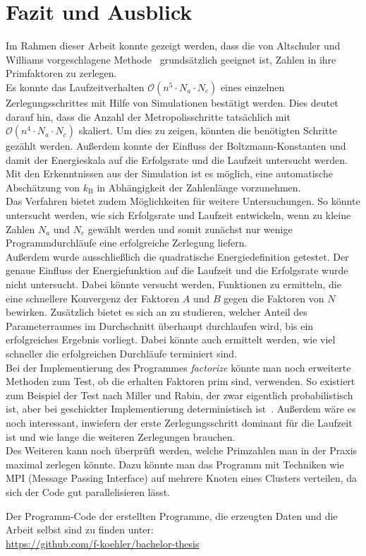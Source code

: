 \chapter{Fazit und Ausblick}\label{ch:conclusion}
Im Rahmen dieser Arbeit konnte gezeigt werden, dass die von Altschuler und Williams vorgeschlagene Methode~\parencite{altschuler} grundsätzlich geeignet ist, Zahlen in ihre Primfaktoren zu zerlegen. \\
Es konnte das Laufzeitverhalten $\mathcal{O}\left(n^5\cdot N_a \cdot N_c\right)$ eines einzelnen Zerlegungsschrittes mit Hilfe von Simulationen bestätigt werden. Dies deutet darauf hin, dass die Anzahl der Metropolisschritte tatsächlich mit $\mathcal{O}\left(n^4\cdot N_a\cdot N_c\right)$ skaliert. Um dies zu zeigen, könnten die benötigten Schritte gezählt werden. Außerdem konnte der Einfluss der Boltzmann-Konstanten und damit der Energieskala auf die Erfolgsrate und die Laufzeit untersucht werden. Mit den Erkenntnissen aus der Simulation ist es möglich, eine automatische Abschätzung von $k_\mathrm{B}$ in Abhängigkeit der Zahlenlänge vorzunehmen. \\
Das Verfahren bietet zudem Möglichkeiten für weitere Untersuchungen. So könnte untersucht werden, wie sich Erfolgsrate und Laufzeit entwickeln, wenn zu kleine Zahlen $N_a$ und $N_c$ gewählt werden und somit zunächst nur wenige Programmdurchläufe eine erfolgreiche Zerlegung liefern. \\
Außerdem wurde ausschließlich die quadratische Energiedefinition getestet. Der genaue Einfluss der Energiefunktion auf die Laufzeit und die Erfolgsrate wurde nicht untersucht. Dabei könnte versucht werden, Funktionen zu ermitteln, die eine schnellere Konvergenz der Faktoren $A$ und $B$ gegen die Faktoren von $N$ bewirken. Zusätzlich bietet es sich an zu studieren, welcher Anteil des Parameterraumes im Durchschnitt überhaupt durchlaufen wird, bis ein erfolgreiches Ergebnis vorliegt. Dabei könnte auch ermittelt werden, wie viel schneller die erfolgreichen Durchläufe terminiert sind.\\
Bei der Implementierung des Programmes \textit{factorize} könnte man noch erweiterte Methoden zum Test, ob die erhalten Faktoren prim sind, verwenden. So existiert zum Beispiel der Test nach Miller und Rabin, der zwar eigentlich probabilistisch ist, aber bei geschickter Implementierung deterministisch ist~\parencite{miller}. Außerdem wäre es noch interessant, inwiefern der erste Zerlegungsschritt dominant für die Laufzeit ist und wie lange die weiteren Zerlegungen brauchen. \\
Des Weiteren kann noch überprüft werden, welche Primzahlen man in der Praxis maximal zerlegen könnte. Dazu könnte man das Programm mit Techniken wie MPI (Message Passing Interface) auf mehrere Knoten eines Clusters verteilen, da sich der Code gut parallelisieren lässt.

\vfill
Der Programm-Code der erstellten Programme, die erzeugten Daten und die Arbeit selbst sind zu finden unter:\\
\url{https://github.com/f-koehler/bachelor-thesis}
